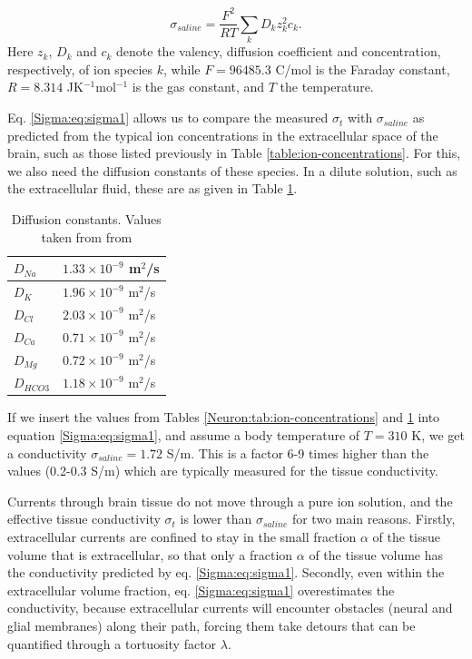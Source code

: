 \begin{equation}
\sigma_{saline} = \frac{F^2}{RT}\sum_{k} D_k z_{k}^2 c_{k}.
\label{Sigma:eq:sigma1}
\end{equation}
Here $z_{k}$, $D_k$ and $c_{k}$ denote the valency, diffusion coefficient and concentration, respectively, of ion species $k$, while $F = 96485.3$ C/mol is the Faraday constant, $R = 8.314$ JK$^{-1}$mol$^{-1}$ is the gas constant, and $T$ the temperature. 

Eq. \ref{Sigma:eq:sigma1} allows us to compare the measured $\sigma_t$ with $\sigma_{saline}$ as predicted from the typical ion concentrations in the extracellular space of the brain, such as those listed previously in Table \ref{table:ion-concentrations}. For this, we also need the diffusion constants of these species. In a dilute solution, such as the extracellular fluid, these are as given in Table \ref{Sigma:tab:diffconsts}.

\begin{table}[h!]
\begin{center}
\caption{Diffusion constants. Values taken from from \citep{Bowen2002, Lyshevski2007}}
\label{Sigma:tab:diffconsts}
    \begin{tabular}{l|l}
    \hline
    $D_{Na}$ & $1.33\times 10^{-9}$ m$^2$/s\\ \hline
    $D_K$ & $1.96  \times 10^{-9}$ m$^2$/s \\ \hline
    $D_{Cl}$ & $2.03 \times 10^{-9}$ m$^2$/s \\ \hline
    $D_{Ca}$ & $0.71\times 10^{-9}$ m$^2$/s \\ \hline
    $D_{Mg}$ & $0.72\times 10^{-9}$ m$^2$/s \\ \hline    
    $D_{HCO3}$ & $1.18\times 10^{-9}$ m$^2$/s \\ \hline
    \end{tabular}
\end{center}
\end{table}

If we insert the values from Tables \ref{Neuron:tab:ion-concentrations} and \ref{Sigma:tab:diffconsts} into equation \ref{Sigma:eq:sigma1}, and assume a body temperature of $T = 310$ K, we get a conductivity $\sigma_{saline} = 1.72$ S/m. This is a factor 6-9 times higher than the values (0.2-0.3 S/m) which are typically measured for the tissue conductivity. 

Currents through brain tissue do not move through a pure ion solution, and the effective tissue conductivity $\sigma_t$ is lower than $\sigma_{saline}$ for two main reasons. Firstly, extracellular currents are confined to stay in the small fraction $\alpha$ of the tissue volume that is extracellular, so that only a fraction $\alpha$ of the tissue volume has the conductivity predicted by eq. \ref{Sigma:eq:sigma1}. Secondly, even within the extracellular volume fraction, eq. \ref{Sigma:eq:sigma1} overestimates the conductivity, because extracellular currents will encounter obstacles (neural and glial membranes) along their path, forcing them take detours that can be quantified through a tortuosity factor $\lambda$. 

